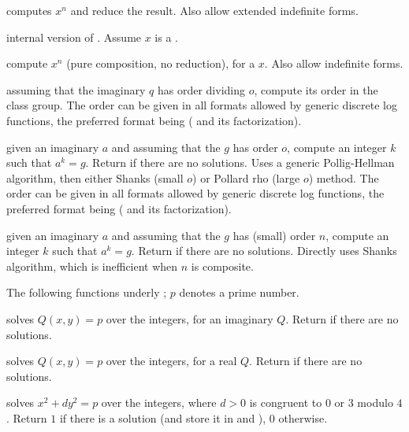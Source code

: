  computes $x^n$ and reduce the result. Also
allow extended indefinite forms.

 internal version of . Assume
$x$ is a .

 compute $x^n$ (pure composition, no
reduction), for a  $x$. Also allow indefinite forms.


assuming that the imaginary  $q$ has order dividing $o$, compute its
order in the class group. The order can be given in all formats allowed by
generic discrete log functions, the preferred format being \kbd{[ord, fa]}
( and its factorization).

 given an imaginary  $a$ and
assuming
that the  $g$ has order $o$, compute an integer $k$ such that $a^k =
g$. Return  if there are no solutions. Uses a generic
Pollig-Hellman algorithm, then either Shanks (small $o$) or Pollard rho
(large $o$) method. The order can be given in all formats allowed by generic
discrete log functions, the preferred format being \kbd{[ord, fa]}
( and its factorization).

 given an imaginary  $a$ and
assuming that the  $g$ has (small) order $n$, compute an integer $k$
such that $a^k = g$. Return  if there are no solutions.
Directly uses Shanks algorithm, which is inefficient when $n$ is composite.


The following functions underly ; $p$ denotes a prime number.

 solves $Q(x,y) = p$ over the integers, for
an imaginary  $Q$. Return  if there are no solutions.

 solves $Q(x,y) = p$ over the integers, for
a real  $Q$. Return  if there are no solutions.

 solves
$x^2+ dy^2 = p$ over the integers, where $d > 0$ is congruent to $0$ or $3$
modulo $4$. Return $1$ if there is a
solution (and store it in  and ), $0$ otherwise.

